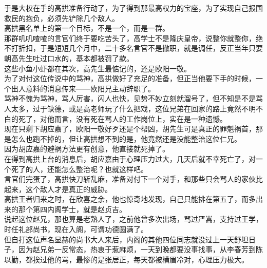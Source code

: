 \begin{multicols}{\theparacolNo}
于是大权在手的高拱准备行动了，为了得到那最高权力的宝座，为了实现自己报国救民的抱负，必须先铲除几个敌人。\\

高拱黑名单上的第一个目标，不是一个，而是一群。\\

那群叽叽喳喳的言官们终于要吃苦头了，高学士不是隆庆皇帝，说整你就整你，绝不打折扣，于是短短几个月中，二十多名言官不是撤职，就是调任，反正当年只要朝高先生吐过口水的，基本都被罚了款。\\

这些小鱼小虾都在其次，高先生最惦记的，还是欧阳一敬。\\

为了对付这位传说中的骂神，高拱做好了充足的准备，但正当他要下手的时候，一个出人意料的消息传来——欧阳兄主动辞职了。\\

骂神不愧为骂神，骂人厉害，闪人也快，见势不妙立刻就溜号了，但不知是不是骂人太多，过于缺德，或是高老师玩了什么把戏，这位兄弟在回家的路上竟然不明不白的死了，对他而言，没有死在骂人的工作岗位上，实在是一种遗憾。\\

现在只剩下胡应嘉了，欧阳一敬好歹还是个帮凶，胡先生可是真正的罪魁祸首，那是怎么也跑不掉的，但让高拱想不到的是，他竟然还是没能整治这位仁兄。\\

因为胡应嘉的避祸方法更有创意，他直接就死掉了。\\

在得到高拱上台的消息后，胡应嘉由于心理压力过大，几天后就不幸死亡了，对一个死了的人，还能怎么整治呢？也就这样吧。\\

言官们完蛋了，高拱快刀斩乱麻，准备对付下一个对手，和那些只会骂人的家伙比起来，这个敌人才是真正的威胁。\\

高拱王者归来之时，在欣喜之余，他也惊奇地发现，自己只能排在第五了，而多出来的那个第四内阁学士，就是赵贞吉。\\

说起这位赵兄，那也算是老熟人了，之前他曾多次出场，骂过严嵩，支持过王学，时任礼部尚书，现在入阁，可谓功德圆满了。\\

但自打这位声名显赫的尚书大人来后，内阁的其他四位同志就没过上一天舒坦日子，因为赵兄弟一反常态，热衷于惹麻烦，一天到晚都要没事找事，从李春芳到陈以勤，都挨过他的骂，最惨的是张居正，每天都被横眉冷对，心理压力极大。\\


\end{multicols}
